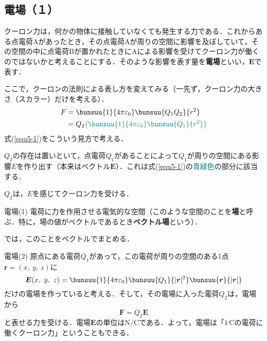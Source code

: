 \subsection{電場（１）}

クーロン力は，何かの物体に接触していなくても発生する力である．これからある点電荷Aがあったとき，その点電荷Aが周りの空間に影響を及ぼしていて，その空間の中に点電荷Bが置かれたときにAによる影響を受けてクーロン力が働くのではないかと考えることにする．そのような影響を表す量を\textbf{電場}といい，$\bm{E}$で表す．

ここで，クーロンの法則による表し方を変えてみる（一先ず，クーロン力の大きさ（スカラー）だけを考える）．
\begin{align}
	F &= \bunsuu{1}{4\pi\varepsilon_0}\bunsuu{Q_1 Q_2}{r^2} \notag\\
	&= Q_2 {\color{teal}\left(\bunsuu{1}{4\pi\varepsilon_0}\bunsuu{Q_1}{r^2}\right)} \label{equ5-1}
\end{align}
式(\ref{equ5-1})をこういう見方で考える．
\begin{enumerate}[label=\textbf{[\arabic*]}, labelsep=10pt, leftmargin=23pt]
	\item $Q_2$の存在は置いといて，点電荷$Q_1$があることによって$Q_1$が周りの空間にある影響$E$を作り出す（本来はベクトル$\bm{E}$）．これは式(\ref{equ5-1})の\textcolor{teal}{青緑色}の部分に該当する．
	\item $Q_2$は，$E$を感じてクーロン力を受ける．
\end{enumerate}

\begin{kousiki}{電場(1)}
	電荷に力を作用させる電気的な空間（このような空間のことを\textbf{場}と呼ぶ．特に，場の値がベクトルであるとき\textbf{ベクトル場}という）．
\end{kousiki}

では，このことをベクトルでまとめる．

\begin{kousiki}{電場(2)}
	原点にある電荷$Q_1$があって，この電荷が周りの空間のある1点$\bm{r} = (x,\ y,\ z)$に
	\begin{equation}
		\bm{E}(x,\ y,\ z) = \bunsuu{1}{4\pi\varepsilon_0}\bunsuu{Q_1}{|\bm{r}|^2}\bunsuu{\bm{r}}{|\bm{r}|}
	\end{equation}
	だけの電場を作っていると考える．そして，その電場に入った電荷$Q_2$は，電場から
	\begin{equation}
		\bm{F} = Q_2 \bm{E}
	\end{equation}
	と表せる力を受ける．電場$\bm{E}$の単位は$\mathrm{N/C}$である．よって，電場は「$1\,\mathrm{C}$の電荷に働くクーロン力」ということもできる．
\end{kousiki}

